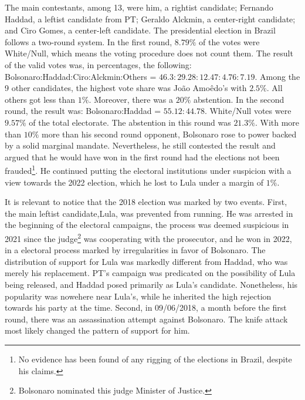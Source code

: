 \documentclass[hidelinks,11pt]{article}
\begin{document}
The main contestants, among 13, were him, a rightist candidate; Fernando Haddad,
a leftist candidate from PT; Geraldo Alckmin, a center-right candidate; and Ciro
Gomes, a center-left candidate. The presidential election in Brazil follows a
two-round system. In the first round, \(8.79\%\) of the votes were White/Null,
which means the voting procedure does not count them. The result of the valid
votes was, in percentages, the following: Bolsonaro:Haddad:Ciro:Alckmin:Others =
\(46.3:29.28:12.47:4.76:7.19 \). Among the 9 other candidates, the highest vote
share was Jo{\~a}o Amo{\^e}do's with \(2.5\%\). All others got less than
\(1\%\). Moreover, there was a \(20\%\) abstention. In the second round, the
result was: Bolsonaro:Haddad = \(55.12 : 44.78 \). White/Null votes were
\(9.57\%\) of the total electorate. The abstention in this round was \(21.3\%\).
With more than \(10\%\) more than his second round opponent, Bolsonaro rose to
power backed by a solid marginal mandate. Nevertheless, he still contested the
result and argued that he would have won in the first round had the elections
not been frauded\footnote{No evidence has been found of any rigging of the
  elections in Brazil, despite his claims.}. He continued putting the
electoral institutions under suspicion with a view towards the 2022 election,
which he lost to Lula under a margin of \(1\%\).


It is relevant to notice that the 2018 election was marked by two events. First,
the main leftist candidate,Lula, was prevented from running. He was arrested in
the beginning of the electoral campaigns, the process was deemed suspicious in
2021 since the judge\footnote{Bolsonaro nominated this judge Minister of
  Justice.} was cooperating with the prosecutor, and he won in 2022, in a
electoral process marked by irregularities in favor of Bolsonaro. The
distribution of support for Lula was markedly different from Haddad, who was
merely his replacement. PT's campaign was predicated on the possibility of Lula
being released, and Haddad posed primarily as Lula's candidate. Nonetheless, his
popularity was nowehere near Lula's, while he inherited the high rejection
towards his party at the time. Second, in 09/06/2018, a month before the first
round, there was an assassination attempt against Bolsonaro. The knife attack
most likely changed the pattern of support for him.
\end{document}

